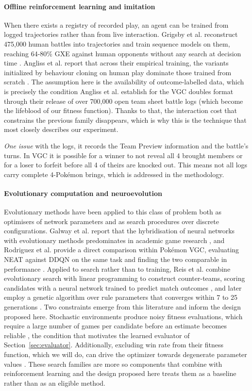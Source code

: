 \documentclass[conference]{IEEEtran}
\begin{document}
\paragraph{Offline reinforcement learning and imitation}
When there exists a registry of recorded play, an agent can be trained from logged
trajectories rather than from live interaction. Grigsby et al. reconstruct
475,000 human battles into trajectories and train sequence
models on them, reaching 64-80\% GXE against human opponents without any
search at decision time \cite{grigsby2025}. Angliss et al. report that across their empirical training,
the variants initialized by behaviour cloning on human play dominate those
trained from scratch \cite{angliss2026}. The assumption here 
is the availability of outcome-labelled data, which is precisely the condition
Angliss et al. establish for the VGC doubles format through their release of
over 700,000 open team sheet battle logs \cite{angliss2026} (which become the lifeblood of our fitness function). Thanks to that, the interaction cost that constrains the previous family
disappears, which is why this is the technique that most closely describes our experiment.

\emph{One issue} with the logs, it records the Team Preview information and the battle's turns. In VGC it is possible for a winner to not reveal all 4 brought members or for a loser to forfeit before all 4 of theirs are knocked out. This means not all logs carry complete 4-Pokémon brings, which is addressed in the methodology.

\paragraph{Evolutionary computation and neuroevolution}
Evolutionary methods have been applied to this class of problem both as
optimisers of network parameters and as search procedures over discrete
configurations. Galway et al. report that the hybridisation of neural networks
with evolutionary methods predominates in academic game research
\cite{galway2008}, and Rodriguez et al. provide a direct comparison within
Pok\'emon VGC, evaluating NEAT against DDQN on the same task
and finding the two comparable in performance \cite{rodriguez2024}. Applied to
search rather than to training, Reis et al. combine evolutionary search with
linear programming to construct counter-teams, scoring candidates with a
neural network trained to predict match outcomes \cite{reis2024}, and later
employ a genetic algorithm over rule parameters that converges within 7 to 25
generations \cite{reis2025}. Two constraints emerge from this literature and
inform the design proposed here. Stochastic
environments produce noisy fitness evaluations, which require a large number of
games per candidate before an estimate becomes reliable \cite{galway2008},
the condition that motivates the learned evaluator of
Section~\ref{sec:evaluator}. Additionally, excluding win
rate from their fitness function, which we will do, can drive the optimizer towards degenerate
parameter values \cite{reis2025}. These search families are more so components that combine with reinforcement learning and the design proposed
here treats them as a baseline
rather than as an eligible method.
\end{document}
